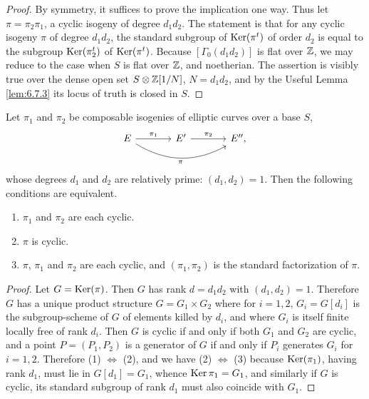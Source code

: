 \begin{proof}
By symmetry, it suffices to prove the implication one way. Thus let $\pi = \pi_2\pi_1$, a cyclic isogeny of degree $d_1d_2$. The statement is that for any cyclic isogeny $\pi$ of degree $d_1d_2$, the standard subgroup of $\operatorname{Ker}(\pi^t)$ of order $d_2$ is equal to the subgroup $\operatorname{Ker}(\pi_2^t)$ of $\operatorname{Ker}(\pi^t)$. Because $[\Gamma_0(d_1d_2)]$ is flat over $\mathbb{Z}$, we may reduce to the case when $S$ is flat over $\mathbb{Z}$, and noetherian. The assertion is visibly true over the dense open set $S \otimes \mathbb{Z}[1/N]$, $N = d_1d_2$, and by the Useful Lemma \ref{lem:6.7.3} its locus of truth is closed in $S$.
\end{proof}

\begin{kprop}\label{prop:6.7.10}
Let $\pi_1$ and $\pi_2$ be composable isogenies of elliptic curves over a base $S$,
\[
\begin{tikzcd}[column sep=large, every label/.append style={font=\scriptsize}]
E \arrow[r, "\pi_1"] \arrow[rr, bend right, "\pi"'] & E' \arrow[r, "\pi_2"] & E'' ,
\end{tikzcd}
\]
whose degrees $d_1$ and $d_2$ are relatively prime: $(d_1,d_2) = 1$. Then the following conditions are equivalent.
\begin{enumerate}[(1)]
\item $\pi_1$ and $\pi_2$ are each cyclic.
\item $\pi$ is cyclic.
\item $\pi$, $\pi_1$ and $\pi_2$ are each cyclic, and $(\pi_1,\pi_2)$ is the standard factorization of $\pi$.
\end{enumerate}
\end{kprop}

\begin{proof}
Let $G = \operatorname{Ker}(\pi)$. Then $G$ has rank $d = d_1d_2$ with $(d_1,d_2) = 1$. Therefore $G$ has a unique product structure $G = G_1 \times G_2$ where for $i = 1,2$, $G_i = G[d_i]$ is the subgroup-scheme of $G$ of elements killed by $d_i$, and where $G_i$ is itself finite locally free of rank $d_i$. Then $G$ is cyclic if and only if both $G_1$ and $G_2$ are cyclic, and a point $P = (P_1,P_2)$ is a generator of $G$ if and only if $P_i$ generates $G_i$ for $i = 1,2$. Therefore (1) $\iff$ (2), and we have (2) $\iff$ (3) because $\operatorname{Ker}(\pi_1)$, having rank $d_1$, must lie in $G[d_1] = G_1$, whence $\operatorname{Ker} \pi_1 = G_1$, and similarly if $G$ is cyclic, its standard subgroup of rank $d_1$ must also coincide with $G_1$.
\end{proof}

